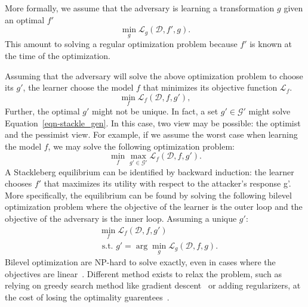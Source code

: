 More formally, we assume that the adversary is learning a transformation $g$ given an optimal $f'$
\begin{equation}
\label{eqn-stackle_gen}
    \min_g \mathcal{L}_g(\mathcal{D}, f', g).
\end{equation}
This amount to solving a regular optimization problem because $f'$ is known at the time of the optimization.

Assuming that the adversary will solve the above optimization problem to choose its $g'$, the learner choose the model $f$ that minimizes its objective function $\mathcal{L}_f$.
\[
\min_f \mathcal{L}_f(\mathcal{D}, f, g'),
\]
Further, the optimal $g'$ might not be unique. In fact, a set $g'\in\mathcal{G}'$ might solve Equation~\eqref{eqn-stackle_gen}. In this case, two view may be possible: the optimist and the pessimist view. For example, if we assume the worst case when learning the model $f$, we may solve the following optimization problem:
\[
\min_f\max_{g'\in\mathcal{G}'} \mathcal{L}_f(\mathcal{D}, f, g').
\]
A Stackleberg equilibrium can be identified by backward induction: the learner chooses $f'$ that maximizes its utility with respect to the attacker’s response g'. More specifically, the equilibrium can be found by solving the following bilevel optimization problem where the objective of the learner is the outer loop and the objective of the adversary is the inner loop. Assuming a unique $g'$:
\begin{equation}
    \label{eqn-bilevel}
    \begin{split}
        &\min_f \mathcal{L}_f(\mathcal{D}, f, g')\\
        & \text{ s.t. } g' = \arg\min_{g}\mathcal{L}_g(\mathcal{D}, f, g).
    \end{split}
\end{equation}
Bilevel optimization are NP-hard to solve exactly, even in cases where the objectives are linear~\cite{jeroslow_polynomial_bilevel}. Different method exists to relax the problem, such as relying on greedy search method like gradient descent~\cite{naveiro_gradient_stackelberg} or adding regularizers, at the cost of losing the optimality guarentees~\cite{colson_bilevel}.

